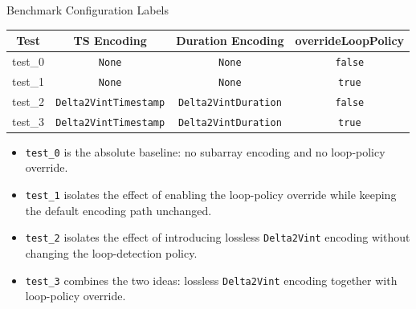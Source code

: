 \documentclass[10pt,aspectratio=169]{beamer}
\begin{document}
\begin{frame}{Benchmark Configuration Labels}
  \small
  \begin{tabular}{|c|c|c|c|}
    \hline
    Test & TS Encoding & Duration Encoding & overrideLoopPolicy \\
    \hline
    test\_0 & \texttt{None} & \texttt{None} & \texttt{false} \\
    \hline
    test\_1 & \texttt{None} & \texttt{None} & \texttt{true} \\
    \hline
    test\_2 & \texttt{Delta2VintTimestamp} & \texttt{Delta2VintDuration} & \texttt{false} \\
    \hline
    test\_3 & \texttt{Delta2VintTimestamp} & \texttt{Delta2VintDuration} & \texttt{true} \\
    \hline
  \end{tabular}

  \vspace{0.6em}
  \begin{itemize}
    \item \texttt{test\_0} is the absolute baseline: no subarray encoding and no loop-policy override.
    \item \texttt{test\_1} isolates the effect of enabling the loop-policy override while keeping the default encoding path unchanged.
    \item \texttt{test\_2} isolates the effect of introducing lossless \texttt{Delta2Vint} encoding without changing the loop-detection policy.
    \item \texttt{test\_3} combines the two ideas: lossless \texttt{Delta2Vint} encoding together with loop-policy override.
  \end{itemize}
\end{frame}
\end{document}
